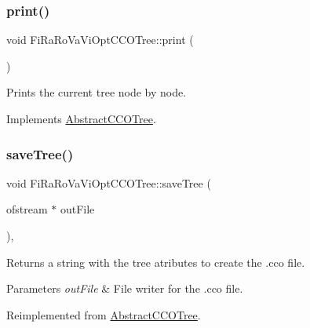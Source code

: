\subsubsection{\texorpdfstring{print()}{print()}}
{\footnotesize\ttfamily void Fi\+Ra\+Ro\+Va\+Vi\+Opt\+C\+C\+O\+Tree\+::print (\begin{DoxyParamCaption}{ }\end{DoxyParamCaption})\hspace{0.3cm}{\ttfamily [virtual]}}

Prints the current tree node by node. 

Implements \mbox{\hyperlink{class_abstract_c_c_o_tree}{Abstract\+C\+C\+O\+Tree}}.

\mbox{\label{class_fi_ra_ro_va_vi_opt_c_c_o_tree_ae711117b173cbb92acd296ff4973f560}} 
\subsubsection{\texorpdfstring{save\+Tree()}{saveTree()}}
{\footnotesize\ttfamily void Fi\+Ra\+Ro\+Va\+Vi\+Opt\+C\+C\+O\+Tree\+::save\+Tree (\begin{DoxyParamCaption}\item[{ofstream $\ast$}]{out\+File }\end{DoxyParamCaption})\hspace{0.3cm}{\ttfamily [protected]}, {\ttfamily [virtual]}}

Returns a string with the tree atributes to create the .cco file. 
\begin{DoxyParams}{Parameters}
{\em out\+File} & File writer for the .cco file. \\
\hline
\end{DoxyParams}


Reimplemented from \mbox{\hyperlink{class_abstract_c_c_o_tree}{Abstract\+C\+C\+O\+Tree}}.

\mbox{\label{class_fi_ra_ro_va_vi_opt_c_c_o_tree_a270d5cd761d5fdad6a260aebd8869e6e}} 
